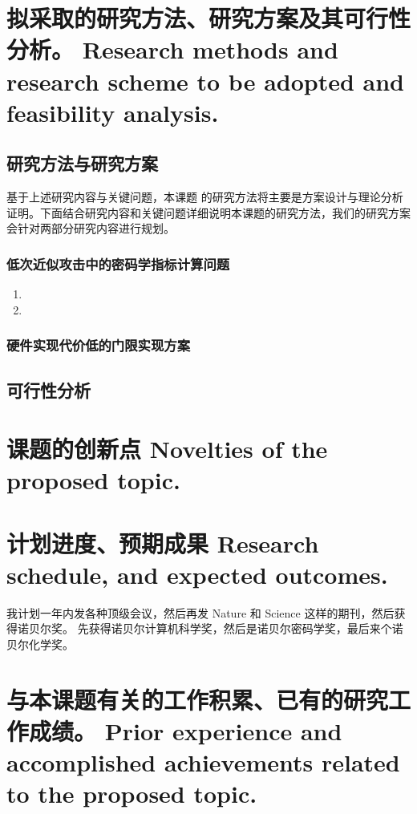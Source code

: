 \documentclass[a4paper,zihao=-4,AutoFakeBold]{ctexart}
\begin{document}
\section{拟采取的研究方法、研究方案及其可行性分析。
  Research methods and research scheme to be adopted
  and feasibility analysis.}

\subsection{研究方法与研究方案}
基于上述研究内容与关键问题，本课题 的研究方法将主要是方案设计与理论分析证明。下面结合研究内容和关键问题详细说明本课题的研究方法，我们的研究方案会针对两部分研究内容进行规划。
\subsubsection{低次近似攻击中的密码学指标计算问题}
\begin{enumerate}[label=(\arabic{*})]
    \item 
    \item 
\end{enumerate}

\subsubsection{硬件实现代价低的门限实现方案}


\subsection{可行性分析}

\section{课题的创新点 Novelties of the proposed topic.}




\section{计划进度、预期成果 Research schedule, and expected outcomes.}

我计划一年内发各种顶级会议，然后再发 Nature 和 Science 这样的期刊，然后获得诺贝尔奖。
先获得诺贝尔计算机科学奖，然后是诺贝尔密码学奖，最后来个诺贝尔化学奖。



\section{与本课题有关的工作积累、已有的研究工作成绩。
  Prior experience and accomplished achievements
  related to the proposed topic.}
\end{document}
